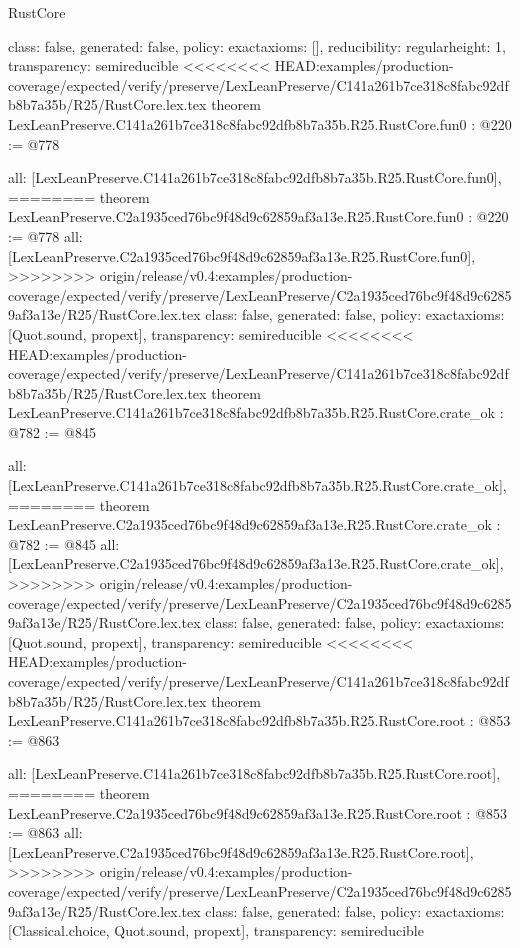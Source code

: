 \begin{lexlean}{RustCore}
\begin{coremodule}
{\begin{coremodule}
{{{  class: false,
  generated: false,
  policy: exact{axioms: []},
  reducibility: regular{height: 1},
  transparency: semireducible
}
<<<<<<<< HEAD:examples/production-coverage/expected/verify/preserve/LexLeanPreserve/C141a261b7ce318c8fabc92dfb8b7a35b/R25/RustCore.lex.tex
theorem LexLeanPreserve.C141a261b7ce318c8fabc92dfb8b7a35b.R25.RustCore.fun0 : @220 := @778 {
  all: [LexLeanPreserve.C141a261b7ce318c8fabc92dfb8b7a35b.R25.RustCore.fun0],
========
theorem LexLeanPreserve.C2a1935ced76bc9f48d9c62859af3a13e.R25.RustCore.fun0 : @220 := @778 {
  all: [LexLeanPreserve.C2a1935ced76bc9f48d9c62859af3a13e.R25.RustCore.fun0],
>>>>>>>> origin/release/v0.4:examples/production-coverage/expected/verify/preserve/LexLeanPreserve/C2a1935ced76bc9f48d9c62859af3a13e/R25/RustCore.lex.tex
  class: false,
  generated: false,
  policy: exact{axioms: [Quot.sound, propext]},
  transparency: semireducible
}
<<<<<<<< HEAD:examples/production-coverage/expected/verify/preserve/LexLeanPreserve/C141a261b7ce318c8fabc92dfb8b7a35b/R25/RustCore.lex.tex
theorem LexLeanPreserve.C141a261b7ce318c8fabc92dfb8b7a35b.R25.RustCore.crate_ok : @782 := @845 {
  all: [LexLeanPreserve.C141a261b7ce318c8fabc92dfb8b7a35b.R25.RustCore.crate_ok],
========
theorem LexLeanPreserve.C2a1935ced76bc9f48d9c62859af3a13e.R25.RustCore.crate_ok : @782 := @845 {
  all: [LexLeanPreserve.C2a1935ced76bc9f48d9c62859af3a13e.R25.RustCore.crate_ok],
>>>>>>>> origin/release/v0.4:examples/production-coverage/expected/verify/preserve/LexLeanPreserve/C2a1935ced76bc9f48d9c62859af3a13e/R25/RustCore.lex.tex
  class: false,
  generated: false,
  policy: exact{axioms: [Quot.sound, propext]},
  transparency: semireducible
}
<<<<<<<< HEAD:examples/production-coverage/expected/verify/preserve/LexLeanPreserve/C141a261b7ce318c8fabc92dfb8b7a35b/R25/RustCore.lex.tex
theorem LexLeanPreserve.C141a261b7ce318c8fabc92dfb8b7a35b.R25.RustCore.root : @853 := @863 {
  all: [LexLeanPreserve.C141a261b7ce318c8fabc92dfb8b7a35b.R25.RustCore.root],
========
theorem LexLeanPreserve.C2a1935ced76bc9f48d9c62859af3a13e.R25.RustCore.root : @853 := @863 {
  all: [LexLeanPreserve.C2a1935ced76bc9f48d9c62859af3a13e.R25.RustCore.root],
>>>>>>>> origin/release/v0.4:examples/production-coverage/expected/verify/preserve/LexLeanPreserve/C2a1935ced76bc9f48d9c62859af3a13e/R25/RustCore.lex.tex
  class: false,
  generated: false,
  policy: exact{axioms: [Classical.choice, Quot.sound, propext]},
  transparency: semireducible
}

}}}}}
\end{coremodule}}
\end{coremodule}
\end{lexlean}
